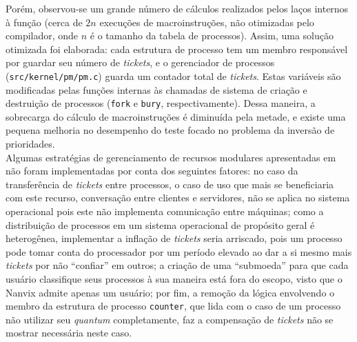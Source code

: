 \documentclass[12pt]{sftex/sftex}
\begin{document}
Porém, observou-se um grande número de cálculos realizados pelos laços internos
à função (cerca de $2n$ execuções de macroinstruções, não otimizadas pelo
compilador, onde $n$ é o tamanho da tabela de processos). Assim, uma solução
otimizada foi elaborada: cada estrutura de processo tem um membro responsável
por guardar seu número de \emph{tickets}, e o gerenciador de processos
(\texttt{src/kernel/pm/pm.c}) guarda um contador total de \emph{tickets}. Estas
variáveis são modificadas pelas funções internas às chamadas de sistema de
criação e destruição de processos (\texttt{fork} e \texttt{bury},
respectivamente). Dessa maneira, a sobrecarga do cálculo de macroinstruções é
diminuída pela metade, e existe uma pequena melhoria no desempenho do teste
focado no problema da inversão de prioridades. \\

Algumas estratégias de gerenciamento de recursos modulares apresentadas em
~\cite[cap. 3]{Waldspurger:1994:LSF:1267638.1267639} não foram implementadas por
conta dos seguintes fatores: no caso da transferência de \emph{tickets} entre
processos, o caso de uso que mais se beneficiaria com este recurso, conversação
entre clientes e servidores, não se aplica no sistema operacional pois este não
implementa comunicação entre máquinas; como a distribuição de processos em um
sistema operacional de propósito geral é heterogênea, implementar a inflação de
\emph{tickets} seria arriscado, pois um processo pode tomar conta do
processador por um período elevado ao dar a si mesmo mais \emph{tickets} por
não ``confiar'' em outros; a criação de uma ``submoeda'' para que cada usuário
classifique seus processos à sua maneira está fora do escopo, visto que o
Nanvix admite apenas um usuário; por fim, a remoção da lógica envolvendo o
membro da estrutura de processo \texttt{counter}, que lida com o caso de um
processo não utilizar seu \emph{quantum} completamente, faz a compensação de
\emph{tickets} não se mostrar necessária neste caso.



\end{document}
